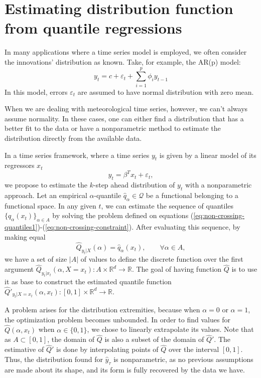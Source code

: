\section{Estimating distribution function from quantile regressions}
\label{sec:estimating-distribution}

In many applications where a time series model is employed, we often consider the innovations' distribution as known. Take, for example, the AR(p) model:
$$y_{t}=c+\varepsilon_{t}+\sum_{i=1}^{p}\phi_{i}y_{t-1}$$
In this model, errors $\varepsilon_t$ are assumed to have normal distribution with zero mean. 

When we are dealing with meteorological time series, however, we can't always assume normality. In these cases, one can either find a distribution that has a better fit to the data or have a nonparametric method to estimate the distribution directly from the available data.

In a time series framework, where a time series $y_t$ is given by a linear model of its regressors $x_t$
$$y_t = \beta^T x_t + \varepsilon_t,$$
we propose to estimate the $k$-step ahead distribution of $y_t$ with a nonparametric approach.
Let an empirical $\alpha$-quantile $\hat{q}_\alpha \in \mathcal{Q}$ be a functional belonging to a functional space. In any given $t$, we can estimate the sequence of quantiles $\{ q_{\alpha}(x_t) \}_{\alpha \in A}$ by solving the problem defined on equations (\ref{eq:non-crossing-quantiles1})-(\ref{eq:non-crossing-constraint}). 
 After evaluating this sequence, by making equal 
\begin{equation}
\hat{Q}_{y_t|X}(\alpha) = \hat{q}_\alpha(x_t), \qquad \forall \alpha \in A,
\end{equation}
we have a set of size $|A|$ of values to define the discrete function over the first argument $\hat{Q}_{y_t|x_t}(\alpha,X=x_t): A \times \mathbb{R}^d \rightarrow \mathbb{R}$. The goal of having function $\hat{Q}$ is to use it as base to construct the estimated quantile function $\hat{Q}'_{y_t|X=x_t}(\alpha,x_t): [0,1] \times \mathbb{R}^d \rightarrow \mathbb{R}$. 

A problem arises for the distribution extremities, because when $\alpha = 0$ or $\alpha = 1$, the optimization problem becomes unbounded. In order to find values for $\hat{Q}(\alpha,x_t)$ when $\alpha \in \{0,1\}$, we chose to linearly extrapolate its values. %
Note that as $A \subset [0,1]$, the domain of $\hat{Q}$ is also a subset of the domain of $\hat{Q}'$. 
The estimative of $\hat{Q}'$ is done by interpolating points of $\hat{Q}$ over the interval $[0,1]$.
Thus, the distribution found for $\hat{y}_{\tau}$ is nonparametric, as no previous assumptions are made about its shape, and its form is fully recovered by the data we have.


